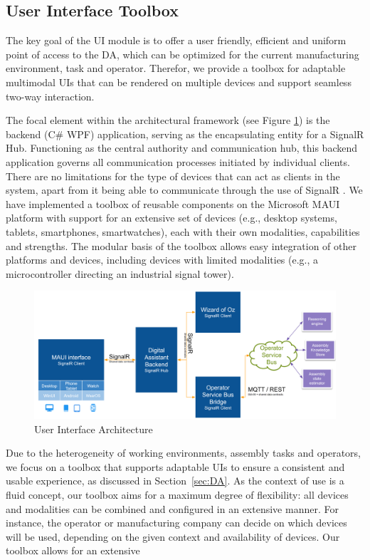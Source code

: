 \subsection{User Interface Toolbox}\label{sec:UI}
The key goal of the UI module is to offer a user friendly, efficient and uniform point of access to the DA, which can be optimized for the current manufacturing environment, task and operator. Therefor, we provide a toolbox for adaptable multimodal UIs that can be rendered on multiple devices and support seamless two-way interaction.


The focal element within the architectural framework (see Figure \ref{fig:ui-architecture}) is the backend (C\# WPF) application, serving as the encapsulating entity for a SignalR Hub. Functioning as the central authority and communication hub, this backend application governs all communication processes initiated by individual clients. 
There are no limitations for the type of devices that can act as clients in the system, apart from it being able to communicate through the use of SignalR \cite{SignalR01}\cite{Sharma_2023}.
We have implemented a toolbox of reusable components on the Microsoft MAUI platform \cite{} with support for an extensive set of devices (e.g., desktop systems, tablets, smartphones, smartwatches), each with their own modalities, capabilities and strengths. The modular basis of the toolbox allows easy integration of other platforms and devices, including devices with limited modalities (e.g., a microcontroller directing an industrial signal tower).

\begin{figure}
    \centering
    \includegraphics[width=1\linewidth]{figs/UI-architecture.png}
    \caption{User Interface Architecture}
    \label{fig:ui-architecture}
\end{figure}

Due to the heterogeneity of working environments, assembly tasks and operators, we focus on a toolbox that supports adaptable UIs to ensure a consistent and usable experience, as discussed in Section~\ref{sec:DA}. As the context of use is a fluid concept, our toolbox aims for a maximum degree of flexibility: all devices and modalities can be combined and configured in an extensive manner. For instance, the operator or manufacturing company can decide on which devices will be used, depending on the given context and availability of devices. Our toolbox allows for an extensive 


